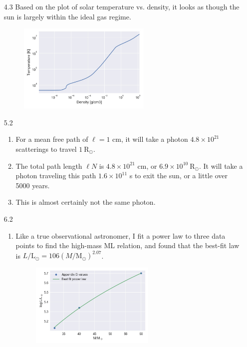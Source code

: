 \documentclass[11pt]{article}
\newcommand\lsol{\mathrm{L}_\odot}
\newcommand\rsol{\mathrm{R}_\odot}
\newcommand\msol{\mathrm{M}_\odot}
\begin{document}
\begin{enumerate}
\item [4.3]
    Based on the plot of solar temperature vs. density, it looks as though the sun is largely within the ideal gas regime.
	\begin{figure}[H]
	\centering
	\includegraphics[width=0.6\textwidth]{temp_density.jpg}
	\end{figure}

\item [5.2]
	\begin{enumerate}
	
    \item For a mean free path of $\ell = 1$ cm, it will take a photon $4.8 \times 10^{21}$ scatterings to travel $1~\rsol$.
    
    \item The total path length $\ell N$ is $4.8 \times 10^{21}$ cm, or $6.9 \times 10^{10}~\rsol$. It will take a photon traveling this path $1.6 \times 10^{11}$ s to exit the sun, or a little over 5000 years.
    
    \item This is almost certainly not the same photon.
    
    \end{enumerate}

\item [6.2]
	\begin{enumerate}
    
    \item Like a true observational astronomer, I fit a power law to three data points to find the high-mass ML relation, and found that the best-fit law is $L/\lsol = 106(M/\msol)^{2.07}$.
	\begin{figure}[H]
	\centering
	\includegraphics[width=0.6\textwidth]{powerlaw.jpg}
	\end{figure}
    

\end{enumerate}
\end{enumerate}
\end{document}
